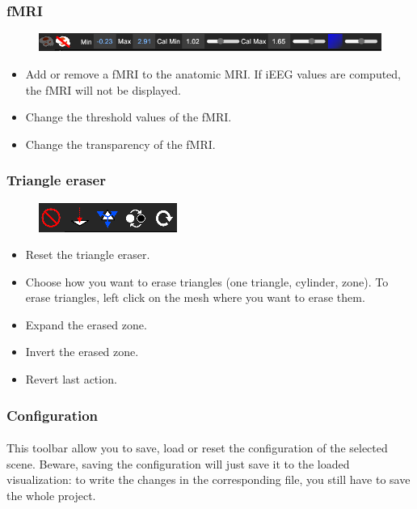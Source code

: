 \documentclass[a4paper]{article}
\begin{document}
\subsubsection{fMRI}
\begin{figure}[H]
\begin{center}
\includegraphics[scale=0.45]{fMRI.png}
\end{center}
\end{figure}
\begin{itemize}
\item Add or remove a fMRI to the anatomic MRI. If iEEG values are computed, the fMRI will not be displayed.
\item Change the threshold values of the fMRI.
\item Change the transparency of the fMRI.
\end{itemize}
\subsubsection{Triangle eraser}
\begin{figure}[H]
\begin{center}
\includegraphics[scale=0.45]{TriEraser.png}
\end{center}
\end{figure}
\begin{itemize}
\item Reset the triangle eraser.
\item Choose how you want to erase triangles (one triangle, cylinder, zone). To erase triangles, left click on the mesh where you want to erase them.
\item Expand the erased zone.
\item Invert the erased zone.
\item Revert last action.
\end{itemize}
\subsubsection{Configuration}
\paragraph{} This toolbar allow you to save, load or reset the configuration of the selected scene. Beware, saving the configuration will just save it to the loaded visualization: to write the changes in the corresponding file, you still have to save the whole project.
\end{document}
